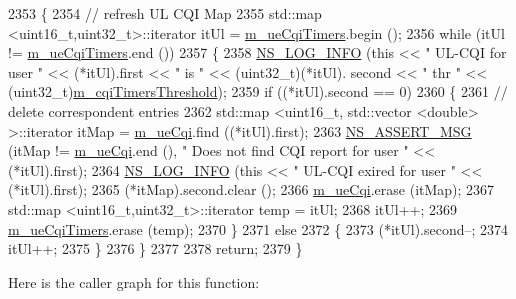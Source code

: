 \begin{DoxyCode}
2353 \{
2354   \textcolor{comment}{// refresh UL CQI  Map}
2355   std::map <uint16\_t,uint32\_t>::iterator itUl = \hyperlink{classns3_1_1FdTbfqFfMacScheduler_a86890d454debae559e2a13f86c0b829c}{m\_ueCqiTimers}.begin ();
2356   \textcolor{keywordflow}{while} (itUl != \hyperlink{classns3_1_1FdTbfqFfMacScheduler_a86890d454debae559e2a13f86c0b829c}{m\_ueCqiTimers}.end ())
2357     \{
2358       \hyperlink{group__logging_gafbd73ee2cf9f26b319f49086d8e860fb}{NS\_LOG\_INFO} (\textcolor{keyword}{this} << \textcolor{stringliteral}{" UL-CQI for user "} << (*itUl).first << \textcolor{stringliteral}{" is "} << (uint32\_t)(*itUl).
      second << \textcolor{stringliteral}{" thr "} << (uint32\_t)\hyperlink{classns3_1_1FdTbfqFfMacScheduler_a5699ce6b376d8919bd386101b5c55e4a}{m\_cqiTimersThreshold});
2359       \textcolor{keywordflow}{if} ((*itUl).second == 0)
2360         \{
2361           \textcolor{comment}{// delete correspondent entries}
2362           std::map <uint16\_t, std::vector <double> >::iterator itMap = \hyperlink{classns3_1_1FdTbfqFfMacScheduler_a74c33465af3fd4306d994e9942836a27}{m\_ueCqi}.find ((*itUl).first);
2363           \hyperlink{assert_8h_aff5ece9066c74e681e74999856f08539}{NS\_ASSERT\_MSG} (itMap != \hyperlink{classns3_1_1FdTbfqFfMacScheduler_a74c33465af3fd4306d994e9942836a27}{m\_ueCqi}.end (), \textcolor{stringliteral}{" Does not find CQI report for user "}
       << (*itUl).first);
2364           \hyperlink{group__logging_gafbd73ee2cf9f26b319f49086d8e860fb}{NS\_LOG\_INFO} (\textcolor{keyword}{this} << \textcolor{stringliteral}{" UL-CQI exired for user "} << (*itUl).first);
2365           (*itMap).second.clear ();
2366           \hyperlink{classns3_1_1FdTbfqFfMacScheduler_a74c33465af3fd4306d994e9942836a27}{m\_ueCqi}.erase (itMap);
2367           std::map <uint16\_t,uint32\_t>::iterator temp = itUl;
2368           itUl++;
2369           \hyperlink{classns3_1_1FdTbfqFfMacScheduler_a86890d454debae559e2a13f86c0b829c}{m\_ueCqiTimers}.erase (temp);
2370         \}
2371       \textcolor{keywordflow}{else}
2372         \{
2373           (*itUl).second--;
2374           itUl++;
2375         \}
2376     \}
2377 
2378   \textcolor{keywordflow}{return};
2379 \}
\end{DoxyCode}


Here is the caller graph for this function\+:


